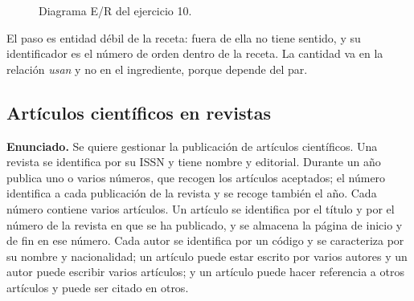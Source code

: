 \begin{figure}[H]
\centering
{}
\caption{Diagrama E/R del ejercicio 10.}
\end{figure}

El paso es entidad débil de la receta: fuera de ella no tiene sentido, y su
identificador es el número de orden dentro de la receta. La cantidad va en la
relación \emph{usan} y no en el ingrediente, porque depende del par.

\subsection{Artículos científicos en revistas}

\textbf{Enunciado.} Se quiere gestionar la publicación de artículos científicos.
Una revista se identifica por su ISSN y tiene nombre y editorial. Durante un año
publica uno o varios números, que recogen los artículos aceptados; el número
identifica a cada publicación de la revista y se recoge también el año. Cada
número contiene varios artículos. Un artículo se identifica por el título y por
el número de la revista en que se ha publicado, y se almacena la página de
inicio y de fin en ese número. Cada autor se identifica por un código y se
caracteriza por su nombre y nacionalidad; un artículo puede estar escrito por
varios autores y un autor puede escribir varios artículos; y un artículo puede
hacer referencia a otros artículos y puede ser citado en otros.

